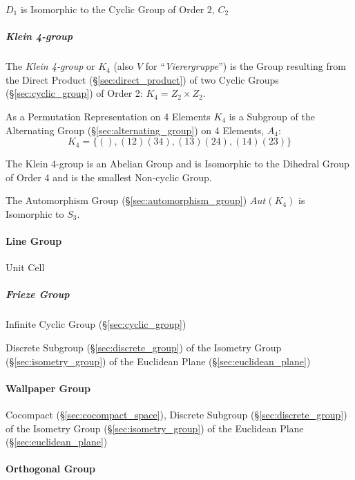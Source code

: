$D_1$ is Isomorphic to the Cyclic Group of Order $2$, $C_2$



\subparagraph{Klein 4-group}\label{sec:klein_4group}\hfill

The \emph{Klein 4-group} or $K_4$ (also $V$ for
``\emph{Vierergruppe}'') is the Group resulting from the Direct
Product (\S\ref{sec:direct_product}) of two Cyclic Groups
(\S\ref{sec:cyclic_group}) of Order 2: $K_4 = Z_2 \times Z_2$.

As a Permutation Representation on 4 Elements $K_4$ is a Subgroup of
the Alternating Group (\S\ref{sec:alternating_group}) on 4 Elements,
$A_4$:
\[
    K_4 = \{ (), (12)(34), (13)(24), (14)(23) \}
\]

The Klein 4-group is an Abelian Group and is Isomorphic to the
Dihedral Group of Order 4 and is the smallest Non-cyclic Group.

The Automorphism Group (\S\ref{sec:automorphism_group}) $Aut(K_4)$ is
Isomorphic to $S_3$.



\paragraph{Line Group}\label{sec:line_group}\hfill

Unit Cell



\subparagraph{Frieze Group}\label{sec:frieze_group}\hfill

Infinite Cyclic Group (\S\ref{sec:cyclic_group})

Discrete Subgroup (\S\ref{sec:discrete_group}) of the Isometry Group
(\S\ref{sec:isometry_group}) of the Euclidean Plane
(\S\ref{sec:euclidean_plane})



\paragraph{Wallpaper Group}\label{sec:wallpaper_group}\hfill

Cocompact (\S\ref{sec:cocompact_space}), Discrete Subgroup
(\S\ref{sec:discrete_group}) of the Isometry Group (\S\ref{sec:isometry_group})
of the Euclidean Plane (\S\ref{sec:euclidean_plane})



\paragraph{Orthogonal Group}\label{sec:orthogonal_group}\hfill


